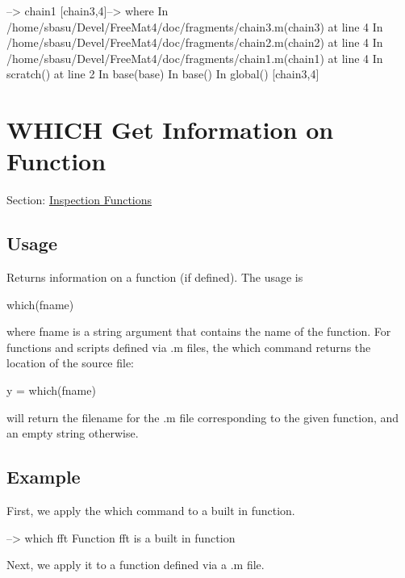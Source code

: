 \begin{DoxyVerbInclude}
--> chain1
[chain3,4]--> where
In /home/sbasu/Devel/FreeMat4/doc/fragments/chain3.m(chain3) at line 4
    In /home/sbasu/Devel/FreeMat4/doc/fragments/chain2.m(chain2) at line 4
    In /home/sbasu/Devel/FreeMat4/doc/fragments/chain1.m(chain1) at line 4
    In scratch() at line 2
    In base(base)
    In base()
    In global()
[chain3,4]
\end{DoxyVerbInclude}
 \hypertarget{inspection_which}{}\section{W\-H\-I\-C\-H Get Information on Function}\label{inspection_which}
Section\-: \hyperlink{sec_inspection}{Inspection Functions} \hypertarget{vtkwidgets_vtkxyplotwidget_Usage}{}\subsection{Usage}\label{vtkwidgets_vtkxyplotwidget_Usage}
Returns information on a function (if defined). The usage is \begin{DoxyVerb}   which(fname)
\end{DoxyVerb}
 where {\ttfamily fname} is a {\ttfamily string} argument that contains the name of the function. For functions and scripts defined via {\ttfamily .m} files, the {\ttfamily which} command returns the location of the source file\-: \begin{DoxyVerb}   y = which(fname)
\end{DoxyVerb}
 will return the filename for the {\ttfamily .m} file corresponding to the given function, and an empty string otherwise. \hypertarget{variables_struct_Example}{}\subsection{Example}\label{variables_struct_Example}
First, we apply the {\ttfamily which} command to a built in function.


\begin{DoxyVerbInclude}
--> which fft
Function fft is a built in function
\end{DoxyVerbInclude}


Next, we apply it to a function defined via a {\ttfamily .m} file.


